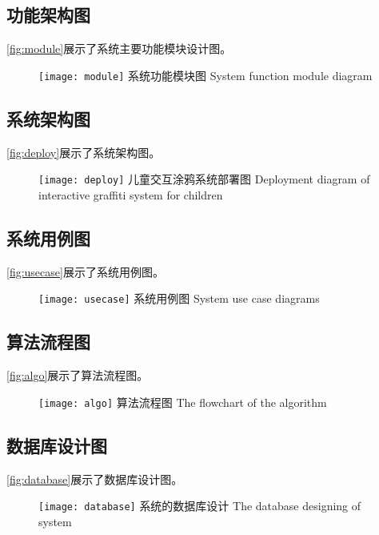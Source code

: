 \documentclass[12pt]{zjutthesis}
\begin{document}
\subsection{功能架构图}
\autoref{fig:module}展示了系统主要功能模块设计图。

\begin{figure}[htp]
  \centering
  \texttt{[image: module]}
  \bicaption
    {系统功能模块图}
    {System function module diagram}
  \label{fig:module}
\end{figure}

\subsection{系统架构图}
\autoref{fig:deploy}展示了系统架构图。

\begin{figure}[htp]
  \centering
  \texttt{[image: deploy]}
  \bicaption
    {儿童交互涂鸦系统部署图}
    {Deployment diagram of interactive graffiti system for children}
  \label{fig:deploy}
\end{figure}

\subsection{系统用例图}
\autoref{fig:usecase}展示了系统用例图。

\begin{figure}[!htp]
  \centering
  \texttt{[image: usecase]}
  \bicaption
    {系统用例图}
    {System use case diagrams}
  \label{fig:usecase}
\end{figure}

\subsection{算法流程图}
\autoref{fig:algo}展示了算法流程图。

\begin{figure}[!htp]
  \centering
  \texttt{[image: algo]}
  \bicaption
    {算法流程图}
    {The flowchart of the algorithm}
  \label{fig:algo}
\end{figure}

\subsection{数据库设计图}
\autoref{fig:database}展示了数据库设计图。

\begin{figure}[!htp]
  \centering
  \texttt{[image: database]}
  \bicaption
    {系统的数据库设计}
    {The database designing of system}
  \label{fig:database}
\end{figure}
\end{document}
